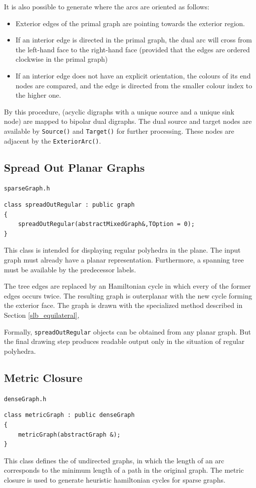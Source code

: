 \documentclass[a4paper,11pt,twoside]{book}
\begin{document}
\begin{multicols}{2}
It is also possible to generate  where the arcs are
oriented as follows:
\begin{itemize}
\item Exterior edges of the primal graph are pointing towards the exterior
    region.
\item If an interior edge is directed in the primal graph, the dual arc will
    cross from the left-hand face to the right-hand face (provided that the
    edges are ordered clockwise in the primal graph)
\item If an interior edge does not have an explicit orientation, the colours of
    its end nodes are compared, and the edge is directed from the smaller
    colour index to the higher one.
\end{itemize}
By this procedure,  (acyclic digraphs with a unique source
and a unique sink node) are mapped to bipolar dual digraphs. The dual source
and target nodes are available by \verb/Source()/ and \verb/Target()/ for
further processing. These nodes are adjacent by the \verb/ExteriorArc()/.


\subsection{Spread Out Planar Graphs}
\label{sbl_spread_out}
\myinclude\verb/sparseGraph.h/
\begin{mymethods}
\begin{verbatim}
class spreadOutRegular : public graph
{
    spreadOutRegular(abstractMixedGraph&,TOption = 0);
}
\end{verbatim}
\end{mymethods}
This class is intended for displaying regular polyhedra in the plane. The input
graph must already have a planar representation. Furthermore, a spanning tree
must be available by the predecessor labels.

The tree edges are replaced by an Hamiltonian cycle in which every of the former
edges occurs twice. The resulting graph is outerplanar with the new cycle forming
the exterior face. The graph is drawn with the specialized method described in
Section \ref{slb_equilateral},

Formally, \verb/spreadOutRegular/ objects can be obtained from any planar graph.
But the final drawing step produces readable output only in the situation of
regular polyhedra.


\subsection{Metric Closure}
\label{slb_metric_closure}
\myinclude\verb/denseGraph.h/
\begin{mymethods}
\begin{verbatim}
class metricGraph : public denseGraph
{
    metricGraph(abstractGraph &);
}
\end{verbatim}
\end{mymethods}
This class defines the  of undirected graphs, in which the
length of an arc corresponds to the minimum length of a path in the original
graph. The metric closure is used to generate heuristic hamiltonian cycles for
sparse graphs.


\end{multicols}
\end{document}
